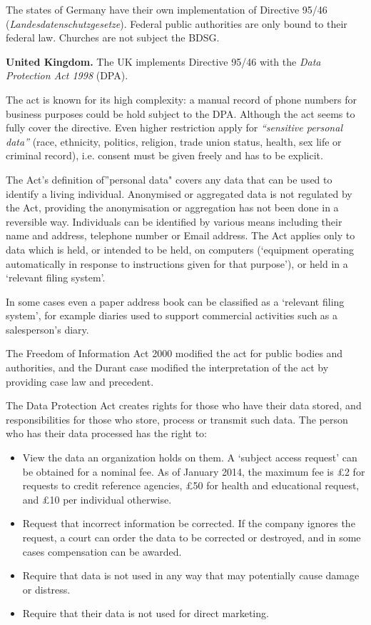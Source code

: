 The states of Germany have their own implementation of Directive 95/46 (\emph{Landesdatenschutzgesetze}).
Federal public authorities are only bound to their federal law.
Churches are not subject the BDSG.

\textbf{United Kingdom.}
The UK implements Directive 95/46 with the \emph{Data Protection Act 1998} (DPA).

The act is known for its high complexity: a manual record of phone numbers for business purposes could be hold subject to the DPA.
Although the act seems to fully cover the directive.
Even higher restriction apply for \emph{``sensitive personal data''} (race, ethnicity, politics, religion, trade union status, health, sex life or criminal record), i.e. consent must be given freely and has to be explicit.

The Act's definition of''personal data" covers any data that can be used to identify a living individual.
Anonymised or aggregated data is not regulated by the Act, providing the anonymisation or aggregation has not been done in a reversible way.
Individuals can be identified by various means including their name and address, telephone number or Email address.
The Act applies only to data which is held, or intended to be held, on computers (`equipment operating automatically in response to instructions given for that purpose'), or held in a `relevant filing system'.

In some cases even a paper address book can be classified as a `relevant filing system', for example diaries used to support commercial activities such as a salesperson's diary.

The Freedom of Information Act 2000 modified the act for public bodies and authorities, and the Durant case modified the interpretation of the act by providing case law and precedent.

The Data Protection Act creates rights for those who have their data stored, and responsibilities for those who store, process or transmit such data.
The person who has their data processed has the right to:
\begin{itemize}
\item View the data an organization holds on them.
A `subject access request' can be obtained for a nominal fee.
As of January 2014, the maximum fee is \pounds2 for requests to credit reference agencies, \pounds50 for health and educational request, and \pounds10 per individual otherwise.
\item Request that incorrect information be corrected.
If the company ignores the request, a court can order the data to be corrected or destroyed, and in some cases compensation can be awarded.
\item Require that data is not used in any way that may potentially cause damage or distress.
\item Require that their data is not used for direct marketing. \cite{3}
\end{itemize}

